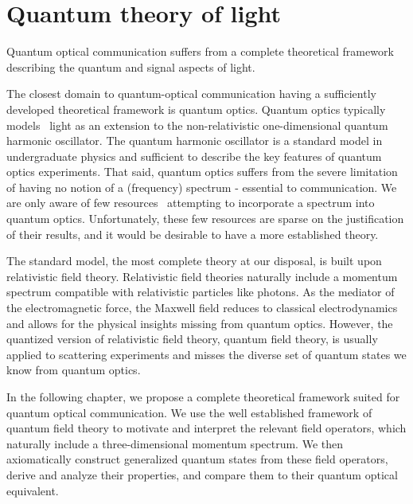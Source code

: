 \chapter{Quantum theory of light}\label{ch:light}

Quantum optical communication suffers from a complete theoretical framework describing the quantum and signal aspects of light.

The closest domain to quantum-optical communication having a sufficiently developed theoretical framework is quantum optics.
Quantum optics typically models~\cite{Fox2006,Gerry2005,Haroche2006,Meystre2007} light as an extension to the non-relativistic one-dimensional quantum harmonic oscillator.
The quantum harmonic oscillator is a standard model in undergraduate physics and sufficient to describe the key features of quantum optics experiments.
That said, quantum optics suffers from the severe limitation of having no notion of a (frequency) spectrum - essential to communication.
We are only aware of few resources~\cite{Barnett2002,Shapiro2009,Loudon2000} attempting to incorporate a spectrum into quantum optics.
Unfortunately, these few resources are sparse on the justification of their results, and it would be desirable to have a more established theory.

The standard model, the most complete theory at our disposal, is built upon relativistic field theory.
Relativistic field theories naturally include a momentum spectrum compatible with relativistic particles like photons.
As the mediator of the electromagnetic force, the Maxwell field reduces to classical electrodynamics and allows for the physical insights missing from quantum optics.
However, the quantized version of relativistic field theory, quantum field theory, is usually applied to scattering experiments and misses the diverse set of quantum states we know from quantum optics.

In the following chapter, we propose a complete theoretical framework suited for quantum optical communication.
We use the well established framework of quantum field theory to motivate and interpret the relevant field operators, which naturally include a three-dimensional momentum spectrum.
We then axiomatically construct generalized quantum states from these field operators, derive and analyze their properties, and compare them to their quantum optical equivalent.
